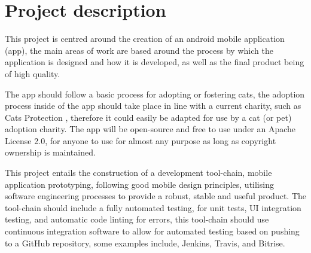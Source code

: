 \documentclass[11pt,fleqn,twoside]{article}
\begin{document}

\mmp



\section{Project description}

This project is centred around the creation of an android mobile application (app), the main areas of work are based around the process by which the application is designed and how it is developed, as well as the final product being of high quality.

The app should follow a basic process for adopting or fostering cats, the adoption process inside of the app should take place in line with a current charity, such as Cats Protection \cite{CATSPROTECTION}, therefore it could easily be adapted for use by a cat (or pet) adoption charity. The app will be open-source and free to use under an Apache License 2.0\cite{APACHE2LICENSE}, for anyone to use for almost any purpose as long as copyright ownership is maintained.


This project entails the construction of a development tool-chain, mobile application prototyping, following good mobile design principles, utilising software engineering processes to provide a robust, stable and useful product. The tool-chain should include a fully automated testing, for unit tests, UI integration testing, and automatic code linting for errors, this tool-chain should use continuous integration software to allow for automated testing based on pushing to a GitHub\cite{GITHUB} repository, some examples include, Jenkins\cite{JENKINS}, Travis\cite{TRAVIS}, and Bitrise\cite{BITRISE}.
\end{document}
